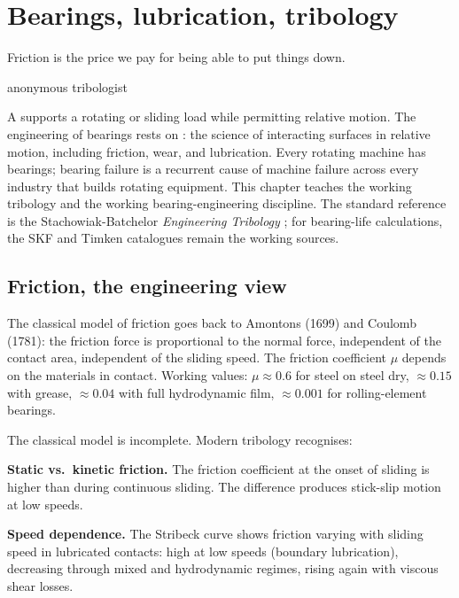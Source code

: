\chapter{Bearings, lubrication, tribology}
\label{vol08:ch02}

\epigraph{Friction is the price we pay for being able to put things down.}{anonymous tribologist}


\noindent
A  supports a rotating or sliding load while permitting relative motion. The engineering of bearings rests on : the science of interacting surfaces in relative motion, including friction, wear, and lubrication. Every rotating machine has bearings; bearing failure is a recurrent cause of machine failure across every industry that builds rotating equipment. This chapter teaches the working tribology and the working bearing-engineering discipline. The standard reference is the Stachowiak-Batchelor \emph{Engineering Tribology} \cite{text:stachowiak-batchelor}; for bearing-life calculations, the SKF and Timken catalogues remain the working sources.

\section{Friction, the engineering view}

The classical model of friction goes back to Amontons (1699) and Coulomb (1781): the friction force is proportional to the normal force, independent of the contact area, independent of the sliding speed. The friction coefficient $\mu$ depends on the materials in contact. Working values: $\mu \approx 0.6$ for steel on steel dry, $\approx 0.15$ with grease, $\approx 0.04$ with full hydrodynamic film, $\approx 0.001$ for rolling-element bearings.

The classical model is incomplete. Modern tribology recognises:

\textbf{Static vs.\ kinetic friction.} The friction coefficient at the onset of sliding is higher than during continuous sliding. The difference produces stick-slip motion at low speeds.

\textbf{Speed dependence.} The Stribeck curve shows friction varying with sliding speed in lubricated contacts: high at low speeds (boundary lubrication), decreasing through mixed and hydrodynamic regimes, rising again with viscous shear losses.

